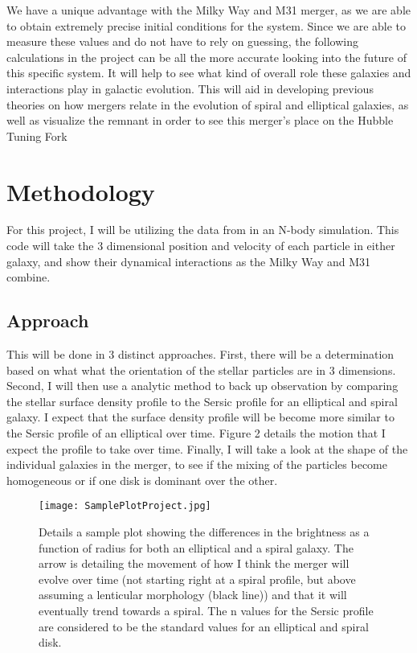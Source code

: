 \documentclass[twocolumn]{aastex63}
\begin{document}
\medskip
We have a unique advantage with the Milky Way and M31 merger, as we are able to obtain extremely precise initial conditions for the system. Since we are able to measure these values and do not have to rely on guessing, the following calculations in the project can be all the more accurate looking into the future of this specific system. It will help to see what kind of overall role these galaxies and interactions play in galactic evolution. This will aid in developing previous theories on how mergers relate in the evolution of spiral and elliptical galaxies, as well as visualize the remnant in order to see this merger's place on the Hubble Tuning Fork

\section{Methodology}

For this project, I will be utilizing the data from \cite{2012ApJ...753....9V} in an N-body simulation. This code will take the 3 dimensional position and velocity of each particle in either galaxy, and show their dynamical interactions as the Milky Way and M31 combine.

\subsection{Approach}

 This will be done in 3 distinct approaches. First, there will be a determination based on what what the orientation of the stellar particles are in 3 dimensions. Second, I will then use a analytic method to back up observation by comparing the stellar surface density profile to the Sersic profile for an elliptical and spiral galaxy. I expect that the surface density profile will be become more similar to the Sersic profile of an elliptical over time. Figure 2 details the motion that I expect the profile to take over time. Finally, I will take a look at the shape of the individual galaxies in the merger, to see if the mixing of the particles become homogeneous or if one disk is dominant over the other. 
 
 \begin{figure}
    \centering
    \texttt{[image: SamplePlotProject.jpg]}
    \caption{Details a sample plot showing the differences in the brightness as a function of radius for both an elliptical and a spiral galaxy. The arrow is detailing the movement of how I think the merger will evolve over time (not starting right at a spiral profile, but above assuming a lenticular morphology (black line)) and that it will eventually trend towards a spiral. The n values for the Sersic profile are considered to be the standard values for an elliptical and spiral disk.}
    \label{fig:my_label}
\end{figure}
\end{document}
